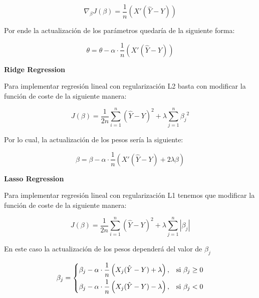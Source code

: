 \documentclass[11pt,fleqn]{book} %
\begin{document}
\begin{equation}
\label{eqn:gradient_mean_squared_error_modified}
\nabla _{\beta} J(\beta) =  \frac{1}{n} \left ( X' (\hat{Y}-Y ) \right )
\end{equation}

Por ende la actualización de los parámetros quedaría de la siguiente forma:

\begin{equation}
\label{eqn:linear_regression_gradient_descent}
\theta = \theta - \alpha \cdot \frac{1}{n} \left ( X' (\hat{Y}-Y ) \right )
\end{equation}

\textbf{Ridge Regression}

Para implementar regresión lineal con regularización L2 basta con modificar la función de coste de la siguiente manera:

\begin{equation}
\label{eqn:mean_squared_error_modified_l2}
J(\beta)=\frac{1}{2n} \sum_{i=1}^{n}\left (\hat{Y} - Y  \right )^{2} + \lambda \sum_{j=1}^{n} {\beta_{j}}^{2}
\end{equation}

Por lo cual, la actualización de los pesos sería la siguiente:

\begin{equation}
\label{eqn:linear_regression_gradient_descent_l2}
\beta = \beta - \alpha \cdot \frac{1}{n} \left ( X' (\hat{Y}-Y ) + 2 \lambda \beta \right )
\end{equation}

\textbf{Lasso Regression}

Para implementar regresión lineal con regularización L1 tenemos que modificar la función de coste de la siguiente manera:

\begin{equation}
\label{eqn:mean_squared_error_modified_l1}
J(\beta)=\frac{1}{2n} \sum_{i=1}^{n}\left (\hat{Y} - Y  \right )^{2} + \lambda \sum_{j=1}^{n} {|\beta_{j}|}
\end{equation}

En este caso la actualización de los pesos dependerá del valor de $\beta_{j}$

\begin{equation}
\label{eqn:linear_regression_gradient_descent_l1}
    \beta_j= 
\begin{dcases}
    \beta_j - \alpha \cdot \frac{1}{n} \left ( X_j (\hat{Y}-Y ) + \lambda \right ),& \text{si } \beta_j \geq 0\\
    \beta_j - \alpha \cdot \frac{1}{n} \left ( X_j (\hat{Y}-Y ) - \lambda \right ),              & \text{si } \beta_j < 0
\end{dcases} 
\end{equation}
\end{document}
